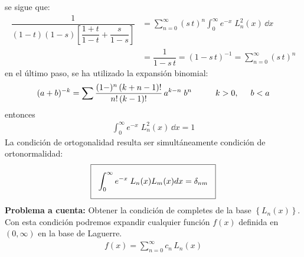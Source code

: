se sigue que:
\begin{align*}
\dfrac{1}{(1-t)(1 - s) \left[ \dfrac{1 + t}{1 - t} + \dfrac{s}{1 - s} \right]} &= \sum_{n=0}^{\infty} (s \, t)^{n} \int_{0}^{\infty} e^{-x} \; L_{n}^{2} (x) \, \dd x \\
&= \dfrac{1}{1 - s \, t} = (1 - s \, t)^{-1} = \sum_{n=0}^{\infty} (s \, t)^{n}
\end{align*}
en el último paso, se ha utilizado la expansión binomial:
\begin{align*}
(a + b)^{-k} = \sum \dfrac{(1-)^{n} \, (k + n - 1)!}{n! \, (k -1)!} \, a^{k - n} \; b^{n} \hspace{1cm} k >0, \hspace{0.5cm} b < a
\end{align*}
entonces
\begin{align*}
\int_{0}^{\infty} e^{-x} \; L_{n}^{2}(x) \, \dd{x} = 1
\end{align*}
La condición de ortogonalidad resulta ser simultáneamente condición de ortonormalidad:
\begin{equation}
\setlength{\fboxsep}{3\fboxsep}\boxed{\int_{0}^{\infty} e^{-x} \; L_{n}(x) L_{m}(x) d x = \delta_{nm} }
\label{eq:ecuacion_08_78}
\end{equation}
\textbf{Problema a cuenta: } Obtener la condición de completes de la base $\left\{ L_{n}(x) \right\}$. Con esta condición podremos expandir cualquier función $f(x)$ definida en $(0, \infty)$ en la base de Laguerre.
\begin{align*}
f(x) = \sum_{n=0}^{\infty} c_{n} \, L_{n} (x)
\end{align*}
